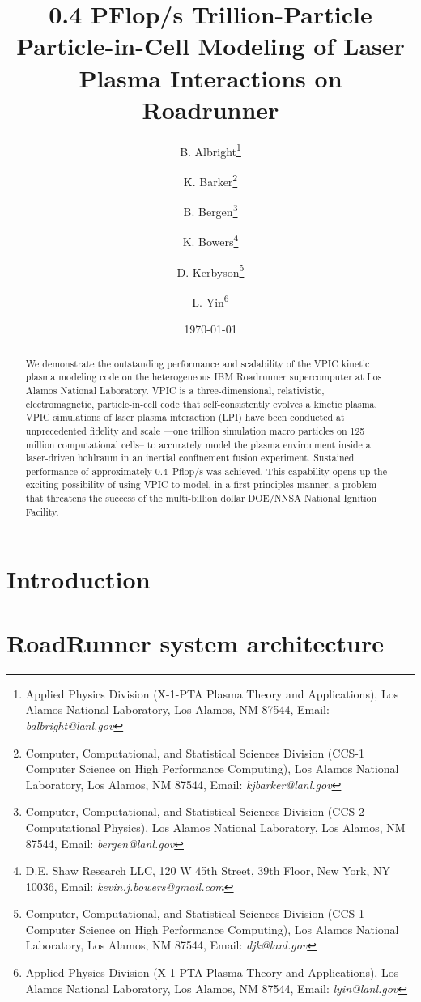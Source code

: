 \documentclass[letter,10pt]{article}
\title{0.4 PFlop/s Trillion-Particle Particle-in-Cell Modeling of Laser Plasma Interactions on Roadrunner}
\author{%
B. Albright\thanks{Applied Physics Division (X-1-PTA Plasma Theory and Applications), Los Alamos National Laboratory, Los Alamos, NM 87544, Email: \emph{balbright@lanl.gov}} \and%
%
K. Barker\thanks{Computer, Computational, and Statistical Sciences Division (CCS-1 Computer Science on High Performance Computing), Los Alamos National Laboratory, Los Alamos, NM 87544, Email: \emph{kjbarker@lanl.gov}} \and%
%
B. Bergen\thanks{Computer, Computational, and Statistical Sciences Division (CCS-2 Computational Physics), Los Alamos National Laboratory, Los Alamos, NM 87544, Email: \emph{bergen@lanl.gov}} \and%
%
K. Bowers\thanks{D.E. Shaw Research LLC, 120 W 45th Street, 39th Floor, New York, NY 10036, Email: \emph{kevin.j.bowers@gmail.com}} \and%
%
D. Kerbyson\thanks{Computer, Computational, and Statistical Sciences Division (CCS-1 Computer Science on High Performance Computing), Los Alamos National Laboratory, Los Alamos, NM 87544, Email: \emph{djk@lanl.gov}} \and%
%
L. Yin\thanks{Applied Physics Division (X-1-PTA Plasma Theory and Applications), Los Alamos National Laboratory, Los Alamos, NM 87544, Email: \emph{lyin@lanl.gov}}}
\date{\today}
\begin{document}
\maketitle
\thispagestyle{empty}

\begin{abstract}
We demonstrate the outstanding performance and scalability of the VPIC kinetic plasma modeling code on the heterogeneous IBM Roadrunner supercomputer at Los Alamos National Laboratory.  VPIC is a three-dimensional, relativistic, electromagnetic, particle-in-cell code that self-consistently evolves a kinetic plasma.  VPIC simulations of laser plasma interaction (LPI) have been conducted at unprecedented fidelity and scale ---one trillion simulation macro particles on 125 million computational cells-- to accurately model the plasma environment inside a laser-driven hohlraum in an inertial confinement fusion experiment.   Sustained performance of approximately 0.4~Pflop/s was achieved.  This capability opens up the exciting possibility of using VPIC to model, in a first-principles manner, a problem that threatens the success of the multi-billion dollar DOE/NNSA National Ignition Facility.  
\end{abstract}

\pagebreak

\section*{Introduction}

\section*{RoadRunner system architecture}
\end{document}

